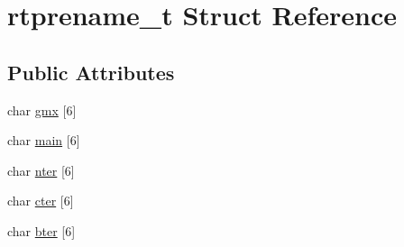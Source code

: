 \hypertarget{structrtprename__t}{\section{rtprename\-\_\-t \-Struct \-Reference}
\label{structrtprename__t}
}
\subsection*{\-Public \-Attributes}
\begin{DoxyCompactItemize}
\item 
char \hyperlink{structrtprename__t_a8ca6f528bdf4b3da71f1425702d4f852}{gmx} \mbox{[}6\mbox{]}
\item 
char \hyperlink{structrtprename__t_ae2a91f0df16a73d7c5bf2625efc22c34}{main} \mbox{[}6\mbox{]}
\item 
char \hyperlink{structrtprename__t_ae906b43e06a7fd18095f5f808e2f6560}{nter} \mbox{[}6\mbox{]}
\item 
char \hyperlink{structrtprename__t_ab79541d0ed7593e9499e154eafdb4f6f}{cter} \mbox{[}6\mbox{]}
\item 
char \hyperlink{structrtprename__t_a3a36dfc76b442bdfc21733b5a330f0c6}{bter} \mbox{[}6\mbox{]}
\end{DoxyCompactItemize}


